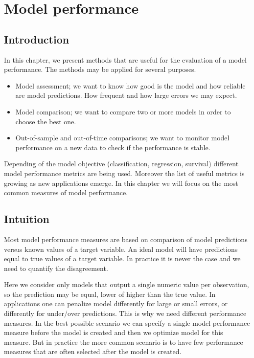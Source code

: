 \documentclass[12pt,]{krantz}
\providecommand{\tightlist}{%
  \setlength{\itemsep}{0pt}\setlength{\parskip}{0pt}}
\begin{document}
\hypertarget{modelPerformance}{%
\section{Model performance}\label{modelPerformance}}

\hypertarget{modelPerformanceIntro}{%
\subsection{Introduction}\label{modelPerformanceIntro}}

In this chapter, we present methods that are useful for the evaluation of a model performance. The methods may be applied for several purposes.

\begin{itemize}
\tightlist
\item
  Model assessment; we want to know how good is the model and how reliable are model predictions. How frequent and how large errors we may expect.
\item
  Model comparison; we want to compare two or more models in order to choose the best one.
\item
  Out-of-sample and out-of-time comparisons; we want to monitor model performance on a new data to check if the performance is stable.
\end{itemize}

Depending of the model objective (classification, regression, survival) different model performance metrics are being used. Moreover the list of useful metrics is growing as new applications emerge. In this chapter we will focus on the most common measures of model performance.

\hypertarget{modelPerformanceIntuition}{%
\subsection{Intuition}\label{modelPerformanceIntuition}}

Most model performance measures are based on comparison of model predictions versus known values of a target variable. An ideal model will have predictions equal to true values of a target variable. In practice it is never the case and we need to quantify the disagreement.

Here we consider only models that output a single numeric value per observation, so the prediction may be equal, lower of higher than the true value. In applications one can penalize model differently for large or small errors, or differently for under/over predictions. This is why we need different performance measures.
In the best possible scenario we can specify a single model performance measure before the model is created and then we optimize model for this measure. But in practice the more common scenario is to have few performance measures that are often selected after the model is created.
\end{document}
